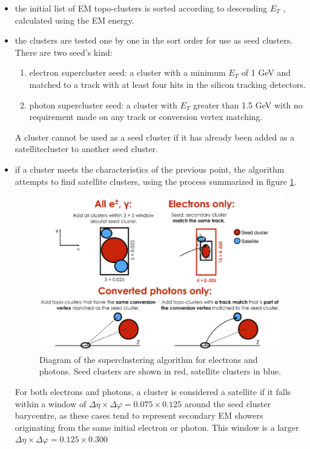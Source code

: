 \documentclass[a4paper, oneside]{book}
\begin{document}
		\begin{itemize}
		\item the initial list of EM topo-clusters is
		sorted according to descending $E_T$ , calculated using the EM energy.
		\item the clusters are tested one by one in the sort order for use as seed clusters. There are two seed's kind:
			\begin{enumerate}[label=\roman*.]
				\item electron supercluster seed: a cluster with a minimum $E_T$ of 1 GeV and matched to a track with at least four hits in the silicon tracking detectors.
				\item photon supercluster seed: a cluster with $E_T$ greater
				than 1.5 GeV with no requirement made on any track or conversion
				vertex matching.
			\end{enumerate}
		A cluster cannot be used as a seed cluster if it has already been added as a satellitecluster to another seed cluster.
		\item if a cluster meets the characteristics of the previous point, the algorithm attempts to find satellite clusters,
		using the process summarized in figure \ref{fig:super_cl}.
		\begin{figure}
			\centering
			\includegraphics[width=0.45\textheight]{tesi_images/super_cluster.png}
			\caption{Diagram of the superclustering algorithm for electrons and photons. Seed clusters are shown in
			red, satellite clusters in blue.}
			\label{fig:super_cl}
		\end{figure}
		For both electrons and photons, a cluster is considered a satellite if it falls within a window of $\Delta\eta \times \Delta\varphi = 0.075 \times 0.125$ around the seed cluster barycentre, as these cases tend to represent secondary EM showers originating from the same initial electron or photon.
		This window is a larger $\Delta\eta \times \Delta\varphi = 0.125 \times 0.300$
		
		
		\end{itemize}
	
\end{document}

